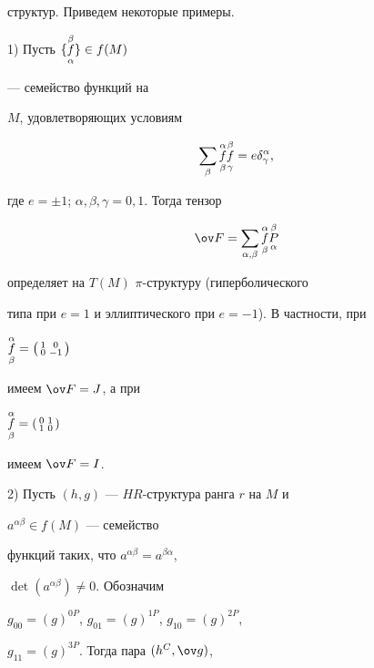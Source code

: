 структур. Приведем некоторые примеры.


\smallskip





1) Пусть $\{\overset{\beta}{\underset{\alpha}{f}}{}\}\in f(M)$


--- семейство функций на


$M$, удовлетворяющих условиям


$$


\sum_\beta\updown{\alpha}{\beta}{f}\updown{\beta}{\gamma}{f}=


e\delta^\alpha_\gamma,


$$


где $e=\pm 1$; $\alpha,\beta,\gamma=0,1$. Тогда тензор


$$


\ov F=\sum_{\alpha,\beta}\updown{\alpha}{\beta}{f}


\updown{\beta}{\alpha}{P}


$$


определяет на $T(M)$\; $\pi$-структуру (гиперболического


типа при $e=1$ и эллиптического при $e=-1$). В частности, при


$\updown{\alpha}{\beta}{f}=\left(


\begin{smallmatrix} 1 & 0 \\ 0 & -1 \end{smallmatrix}\right)$


имеем $\ov F=J$, а при


$\updown{\alpha}{\beta}{f}=\left(


\begin{smallmatrix} 0 & 1 \\ 1 & 0 \end{smallmatrix}\right)$


имеем $\ov F=I$.


\smallskip





2) Пусть $(h,g)$ --- $HR$-структура ранга $r$ на $M$ и


$a^{\alpha\beta}\in f(M)$ --- семейство


функций таких, что $a^{\alpha\beta}=a^{\beta\alpha}$,


$\det(a^{\alpha\beta})\ne 0$. Обозначим


$g_{00}=(g)^{0P}$, $g_{01}=(g)^{1P}$, $g_{10}=(g)^{2P}$,


$g_{11}=(g)^{3P}$. Тогда пара $(h^C,\ov g)$,


